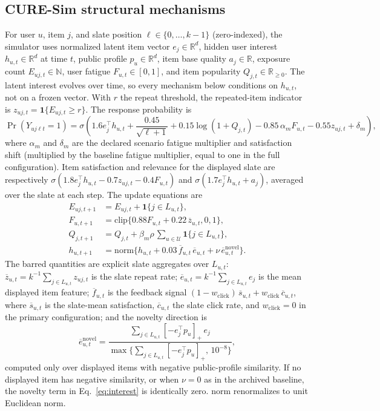 \documentclass[pdflatex,sn-mathphys-num]{sn-jnl}
\theoremstyle{thmstyleone}
\theoremstyle{thmstyletwo}
\theoremstyle{thmstylethree}
\begin{document}
\begin{appendices}
\section{CURE-Sim structural mechanisms}\label{app:scm}
For user $u$, item $j$, and slate position $\ell\in\{0,\ldots,k-1\}$ (zero-indexed), the simulator uses normalized latent item vector $e_j\in\mathbb{R}^d$, hidden user interest $h_{u,t}\in\mathbb{R}^d$ at time $t$, public profile $p_u\in\mathbb{R}^d$, item base quality $a_j\in\mathbb{R}$, exposure count $E_{uj,t}\in\mathbb{N}$, user fatigue $F_{u,t}\in[0,1]$, and item popularity $Q_{j,t}\in\mathbb{R}_{\geq0}$. The latent interest evolves over time, so every mechanism below conditions on $h_{u,t}$, not on a frozen vector. With $r$ the repeat threshold, the repeated-item indicator is $z_{uj,t}=\mathbf{1}\{E_{uj,t}\ge r\}$. The response probability is
\begin{equation}
 \Pr(Y_{uj\ell t}=1)=\sigma\!\left(1.6 e_j^\top h_{u,t}+\frac{0.45}{\sqrt{\ell+1}}+0.15\log(1+Q_{j,t})-0.85\,\alpha_m F_{u,t}-0.55z_{uj,t}+\delta_m\right),
\label{eq:response}
\end{equation}
where $\alpha_m$ and $\delta_m$ are the declared scenario fatigue multiplier and satisfaction shift (multiplied by the baseline fatigue multiplier, equal to one in the full configuration). Item satisfaction and relevance for the displayed slate are respectively $\sigma(1.8e_j^\top h_{u,t}-0.7z_{uj,t}-0.4F_{u,t})$ and $\sigma(1.7e_j^\top h_{u,t}+a_j)$, averaged over the slate at each step. The update equations are
\begin{align}
 E_{uj,t+1}&=E_{uj,t}+\mathbf{1}\{j\in L_{u,t}\},\label{eq:exposure}\\
 F_{u,t+1}&=\mathrm{clip}\{0.88F_{u,t}+0.22\,\overline z_{u,t},0,1\},\label{eq:fatigue-update}\\
 Q_{j,t+1}&=Q_{j,t}+\beta_m\rho\,\sum_{u\in\mathcal U}\mathbf{1}\{j\in L_{u,t}\},\label{eq:popularity}\\
 h_{u,t+1}&=\mathrm{norm}\{h_{u,t}+0.03\,\overline f_{u,t}\,\overline e_{u,t}+\nu\,\overline e^{\mathrm{novel}}_{u,t}\}.\label{eq:interest}
\end{align}
The barred quantities are explicit slate aggregates over $L_{u,t}$: $\overline z_{u,t}=k^{-1}\sum_{j\in L_{u,t}}z_{uj,t}$ is the slate repeat rate; $\overline e_{u,t}=k^{-1}\sum_{j\in L_{u,t}}e_j$ is the mean displayed item feature; $\overline f_{u,t}$ is the feedback signal $(1-w_{\mathrm{click}})\,\overline s_{u,t}+w_{\mathrm{click}}\,\overline c_{u,t}$, where $\overline s_{u,t}$ is the slate-mean satisfaction, $\overline c_{u,t}$ the slate click rate, and $w_{\mathrm{click}}=0$ in the primary configuration; and the novelty direction is
\begin{equation}
 \overline e^{\mathrm{novel}}_{u,t}=\frac{\sum_{j\in L_{u,t}}[-e_j^\top p_u]_+\,e_j}{\max\{\sum_{j\in L_{u,t}}[-e_j^\top p_u]_+,\,10^{-8}\}},
\end{equation}
computed only over displayed items with negative public-profile similarity. If no displayed item has negative similarity, or when $\nu=0$ as in the archived baseline, the novelty term in Eq.~\eqref{eq:interest} is identically zero. $\mathrm{norm}$ renormalizes to unit Euclidean norm.


\end{appendices}
\end{document}
